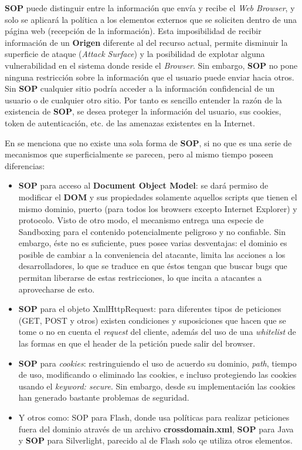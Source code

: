     \textbf{SOP} puede distinguir entre la información que envía y recibe el \textit{Web Browser}, y solo se aplicará la política a los elementos externos que se soliciten dentro de una página web (recepción de la información). Esta imposibilidad de recibir información de un \textbf{Origen} diferente al del recurso actual, permite disminuir la superficie de ataque (\textit{Attack Surface}) y la posibilidad de explotar alguna vulnerabilidad en el sistema donde reside el \textit{Browser}. Sin embargo, \textbf{SOP} no pone ninguna restricción sobre la información que el usuario puede enviar hacia otros. Sin \textbf{SOP} cualquier sitio podría acceder a la información confidencial de un usuario o de cualquier otro sitio. Por tanto es sencillo entender la razón de la existencia de \textbf{SOP}, se desea proteger la información del usuario, sus cookies, token de autenticación, etc. de las amenazas existentes en la Internet.


    En \cite{Zalewsk08} se menciona que no existe una sola forma de \textbf{SOP}, si no que es una serie de mecanismos que superficialmente se parecen, pero al mismo tiempo poseen diferencias:

    \begin{itemize}
        \item \textbf{SOP} para acceso al \textbf{Document Object Model}: se dará permiso de modificar el \textbf{DOM} y sus propiedades solamente aquellos scripts que tienen el mismo dominio, puerto (para todos los browsers excepto Internet Explorer) y protocolo. Visto de otro modo, el mecanismo entrega una especie de Sandboxing para el contenido potencialmente peligroso y no confiable. Sin embargo, éste no es suficiente, pues posee varias desventajas: el dominio es posible de cambiar a la conveniencia del atacante, limita las acciones a los desarrolladores, lo que se traduce en que éstos tengan que buscar bugs que permitan liberarse de estas restricciones, lo que incita a atacantes a aprovecharse de esto.
        \item \textbf{SOP} para el objeto XmlHttpRequest: para diferentes tipos de peticiones (GET, POST y otros) existen condiciones y suposiciones que hacen que se tome o no en cuenta el \textit{request} del cliente, además del uso de una \textit{whitelist} de las formas en que el header de la petición puede salir del browser.
        \item \textbf{SOP} para \textit{cookies}: restringuiendo el uso de acuerdo su dominio, \textit{path}, tiempo de uso, modificando o eliminado las cookies, e incluso protegiendo las cookies usando el \textit{keyword: secure}. Sin embargo, desde su implementación las cookies han generado bastante problemas de seguridad.
        \item Y otros como: {SOP} para Flash, donde usa políticas para realizar peticiones fuera del dominio através de un archivo \textbf{crossdomain.xml}, \textbf{SOP} para Java y \textbf{SOP} para Silverlight, parecido al de Flash solo qe utiliza otros elementos.
    \end{itemize}

